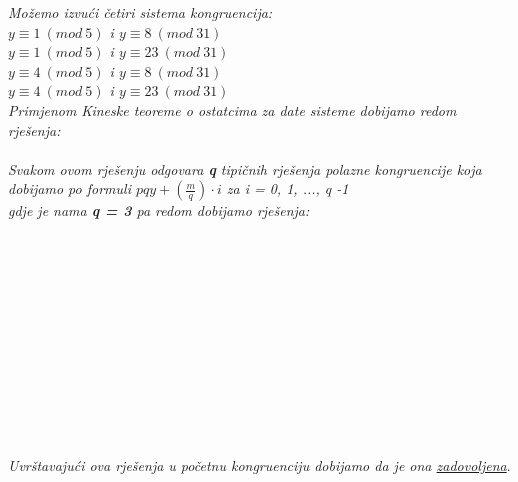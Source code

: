 \documentclass[12pt]{article}
\begin{document}
\begin{enumerate}
\begin{center}
            \vspace{0.15cm}
            \textit{ Možemo izvući četiri sistema kongruencija:\\$y \equiv 1\ (mod\ 5)$ i $y \equiv 8\ (mod\ 31)$\\$y \equiv 1\ (mod\ 5)$ i $y \equiv 23\ (mod\ 31)$\\$y \equiv 4\ (mod\ 5)$ i $y \equiv 8\ (mod\ 31)$\\$y \equiv 4\ (mod\ 5)$ i $y \equiv 23\ (mod\ 31)$\\}
                           \vspace*{0.25cm}
            \textit{Primjenom Kineske teoreme o ostatcima za date sisteme dobijamo redom rješenja:\\
               \\ }
            \vspace{0.25cm}
            \textit{Svakom ovom rješenju odgovara \textbf{q} tipičnih rješenja polazne kongruencije koja dobijamo po formuli $pqy + (\frac{m}{q})\cdot i$ za i = 0, 1, ..., q -1 \\ \vspace{0.15cm} gdje je nama \textbf{q = 3} pa redom dobijamo rješenja:\\ \vspace{0.25cm}
             \\ \vspace{0.15cm}
             \\ \vspace{0.15cm}
             \\ \vspace{0.15cm}
             \\ \vspace{0.15cm}
             \\ \vspace{0.15cm}
             \\ \vspace{0.15cm}
             \\ \vspace{0.15cm}
             \\ \vspace{0.15cm}
             \\ \vspace{0.15cm}
             \\ \vspace{0.15cm}
             \\ \vspace{0.15cm}
             \\ \vspace{0.15cm}
            Uvrštavajući ova rješenja u početnu kongruenciju dobijamo da je ona \underline{zadovoljena}}.
            

\end{center}
\end{enumerate}
\end{document}
